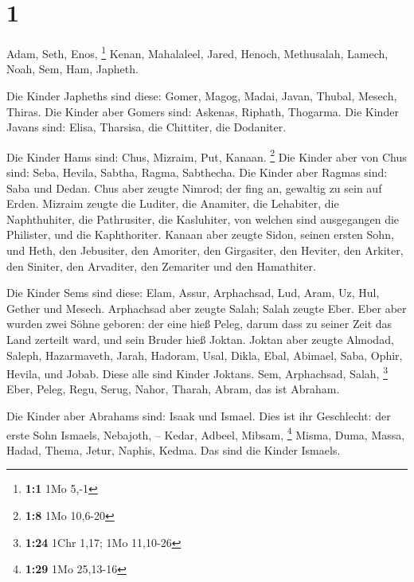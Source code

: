 \hypertarget{section}{%
\section{1}\label{section}}

 Adam, Seth, Enos, \footnote{\textbf{1:1} 1Mo 5,-1}
 Kenan, Mahalaleel, Jared,  Henoch,
Methusalah, Lamech,  Noah, Sem, Ham, Japheth.

 Die Kinder Japheths sind diese: Gomer, Magog, Madai,
Javan, Thubal, Mesech, Thiras.  Die Kinder aber Gomers
sind: Askenas, Riphath, Thogarma.  Die Kinder Javans sind:
Elisa, Tharsisa, die Chittiter, die Dodaniter.

 Die Kinder Hams sind: Chus, Mizraim, Put, Kanaan.
\footnote{\textbf{1:8} 1Mo 10,6-20}  Die Kinder aber von
Chus sind: Seba, Hevila, Sabtha, Ragma, Sabthecha. Die Kinder aber
Ragmas sind: Saba und Dedan.  Chus aber zeugte Nimrod;
der fing an, gewaltig zu sein auf Erden.  Mizraim zeugte
die Luditer, die Anamiter, die Lehabiter, die Naphthuhiter,
 die Pathrusiter, die Kasluhiter, von welchen sind
ausgegangen die Philister, und die Kaphthoriter.  Kanaan
aber zeugte Sidon, seinen ersten Sohn, und Heth,  den
Jebusiter, den Amoriter, den Girgasiter,  den Heviter,
den Arkiter, den Siniter,  den Arvaditer, den Zemariter
und den Hamathiter.

 Die Kinder Sems sind diese: Elam, Assur, Arphachsad,
Lud, Aram, Uz, Hul, Gether und Mesech.  Arphachsad aber
zeugte Salah; Salah zeugte Eber.  Eber aber wurden zwei
Söhne geboren: der eine hieß Peleg, darum dass zu seiner Zeit das Land
zerteilt ward, und sein Bruder hieß Joktan.  Joktan aber
zeugte Almodad, Saleph, Hazarmaveth, Jarah,  Hadoram,
Usal, Dikla,  Ebal, Abimael, Saba,  Ophir,
Hevila, und Jobab. Diese alle sind Kinder Joktans.  Sem,
Arphachsad, Salah, \footnote{\textbf{1:24} 1Chr 1,17; 1Mo 11,10-26}
 Eber, Peleg, Regu,  Serug, Nahor, Tharah,
 Abram, das ist Abraham.

 Die Kinder aber Abrahams sind: Isaak und Ismael.
 Dies ist ihr Geschlecht: der erste Sohn Ismaels,
Nebajoth, -- Kedar, Adbeel, Mibsam, \footnote{\textbf{1:29} 1Mo 25,13-16}
 Misma, Duma, Massa, Hadad, Thema,  Jetur,
Naphis, Kedma. Das sind die Kinder Ismaels.

